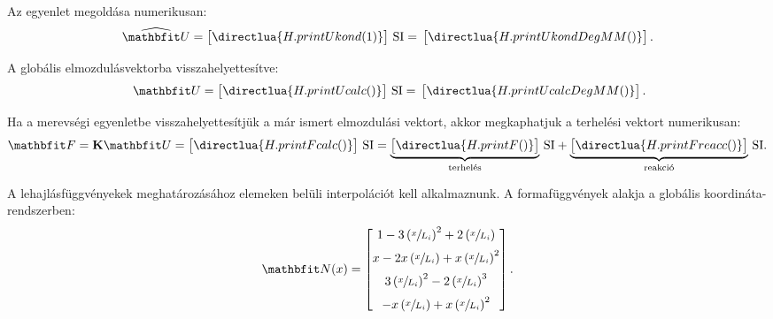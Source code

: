Az egyenlet megoldása numerikusan:
\begin{equation}
  \sifigures{4} \sisci{}
  \widehat{\rvec U} = \begin{bmatrix}
    \directlua{H.printUkond(1)}
  \end{bmatrix} \, \mathrm{SI}
  =
  \siplaces{4} \sifix{}
  \begin{bmatrix}
    \directlua{H.printUkondDegMM()}
  \end{bmatrix}
  \text.
  \label{eq:numericCond}
\end{equation}

A globális elmozdulásvektorba visszahelyettesítve:
\begin{equation}
  \sifigures{3} \sisci\
  {\rvec U} = \begin{bmatrix}
    \directlua{H.printUcalc()}
  \end{bmatrix} \, \mathrm{SI}
  =
  \siplaces{4} \sifix{}
  \begin{bmatrix}
    \directlua{H.printUcalcDegMM()}
  \end{bmatrix}
  \text.
\end{equation}

Ha a merevségi egyenletbe visszahelyettesítjük a már ismert elmozdulási vektort,
akkor megkaphatjuk a terhelési vektort numerikusan:
\begin{equation}
  \siplaces{3}
  \rvec F = \rmat K \rvec U =
  \begin{bmatrix}
    \directlua{H.printFcalc()}
  \end{bmatrix}
  \, \mathrm{SI}
  =
  \underbrace{\begin{bmatrix}
      \directlua{H.printF()}
    \end{bmatrix}}_\text{terhelés}
  \, \mathrm{SI}
  +
  \underbrace{\begin{bmatrix}
      \directlua{H.printFreacc()}
    \end{bmatrix}}_\text{reakció}
  \, \mathrm{SI}
  \text.
  \label{eq:Fcalc}
\end{equation}

A lehajlásfüggvényekek meghatározásához elemeken belüli interpolációt kell
alkalmaznunk. A formafüggvények alakja a globális koordináta-rendszerben:
\begin{equation}
  \renewcommand\a{\left(\sfrac{x}{L_i}\right)}
  \rvec N(x) =
  \begin{bmatrix}
    1 - 3\a^2 + 2\a  \\[2mm]
    x - 2x\a + x\a^2 \\[2mm]
    3\a^2 - 2\a^3    \\[2mm]
    -x\a + x\a^2
  \end{bmatrix}
  \text.
  \label{eq:N-param}
\end{equation}

